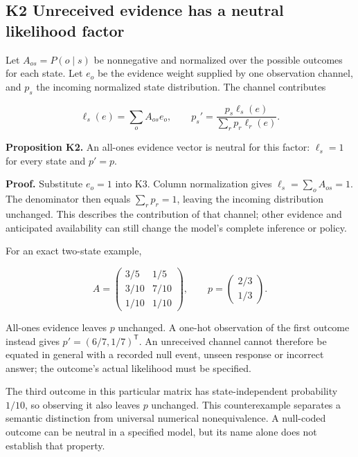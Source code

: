 \documentclass[
  american,
  11pt,
  letterpaper,
]{article}
\newcounter{none} %
\begin{document}
\subsection{K2 Unreceived evidence has a neutral likelihood factor}\label{k2-unreceived-evidence-has-a-neutral-likelihood-factor}

Let \(A_{os}=P(o\mid s)\) be nonnegative and normalized over the possible outcomes for each state. Let \(e_o\) be the evidence weight supplied by one observation channel, and \(p_s\) the incoming normalized state distribution. The channel contributes

\begin{equation}
\ell_s(e)=\sum_oA_{os}e_o,\qquad
p_s'=\frac{p_s\ell_s(e)}{\sum_rp_r\ell_r(e)}.
\tag{K3}
\end{equation}

\textbf{Proposition K2.} An all-ones evidence vector is neutral for this factor: \(\ell_s=1\) for every state and \(p'=p\).

\textbf{Proof.} Substitute \(e_o=1\) into K3. Column normalization gives \(\ell_s=\sum_oA_{os}=1\). The denominator then equals \(\sum_rp_r=1\), leaving the incoming distribution unchanged. This describes the contribution of that channel; other evidence and anticipated availability can still change the model's complete inference or policy.

For an exact two-state example,

\begin{equation}
A=\begin{pmatrix}3/5&1/5\\3/10&7/10\\1/10&1/10\end{pmatrix},\qquad
p=\begin{pmatrix}2/3\\1/3\end{pmatrix}.
\tag{K4}
\end{equation}

All-ones evidence leaves \(p\) unchanged. A one-hot observation of the first outcome instead gives \(p'=(6/7,1/7)^{\mathsf T}\). An unreceived channel cannot therefore be equated in general with a recorded null event, unseen response or incorrect answer; the outcome's actual likelihood must be specified.

The third outcome in this particular matrix has state-independent probability \(1/10\), so observing it also leaves \(p\) unchanged. This counterexample separates a semantic distinction from universal numerical nonequivalence. A null-coded outcome can be neutral in a specified model, but its name alone does not establish that property.
\end{document}
